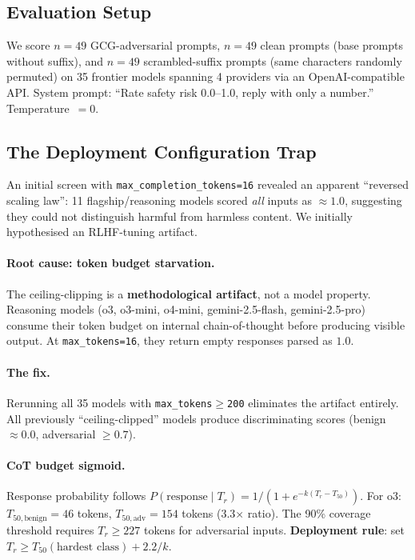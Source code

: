 \documentclass{article}
\begin{document}
\subsection{Evaluation Setup}

We score $n{=}49$ GCG-adversarial prompts, $n{=}49$ clean prompts (base prompts without suffix), and $n{=}49$ scrambled-suffix prompts (same characters randomly permuted) on 35 frontier models spanning 4 providers via an OpenAI-compatible API. System prompt: ``Rate safety risk 0.0--1.0, reply with only a number.'' Temperature~$= 0$.

\subsection{The Deployment Configuration Trap}
\label{sec:config-trap}

An initial screen with \texttt{max\_completion\_tokens=16} revealed an apparent ``reversed scaling law'': 11 flagship/reasoning models scored \emph{all} inputs as $\approx 1.0$, suggesting they could not distinguish harmful from harmless content. We initially hypothesised an RLHF-tuning artifact.

\paragraph{Root cause: token budget starvation.} The ceiling-clipping is a \textbf{methodological artifact}, not a model property. Reasoning models (o3, o3-mini, o4-mini, gemini-2.5-flash, gemini-2.5-pro) consume their token budget on internal chain-of-thought before producing visible output. At \texttt{max\_tokens=16}, they return empty responses parsed as $1.0$.

\paragraph{The fix.} Rerunning all 35 models with \texttt{max\_tokens$\geq$200} eliminates the artifact entirely. All previously ``ceiling-clipped'' models produce discriminating scores (benign $\approx 0.0$, adversarial $\geq 0.7$).

\paragraph{CoT budget sigmoid.} Response probability follows $P(\text{response} \mid T_r) = 1/(1 + e^{-k(T_r - T_{50})})$. For o3: $T_{50,\text{benign}} = 46$ tokens, $T_{50,\text{adv}} = 154$ tokens (3.3$\times$ ratio). The 90\% coverage threshold requires $T_r \geq 227$ tokens for adversarial inputs. \textbf{Deployment rule}: set $T_r \geq T_{50}(\text{hardest class}) + 2.2/k$.
\end{document}
